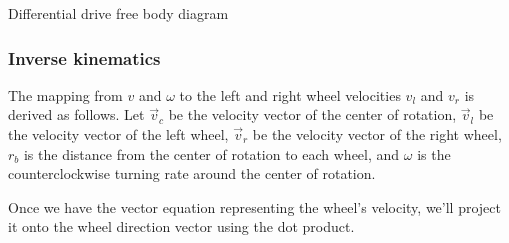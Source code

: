 \begin{bookfigure}

  \caption{Differential drive free body diagram}
  \label{fig:differential_drive_fbd}
\end{bookfigure}

\subsubsection{Inverse kinematics}

The mapping from $v$ and $\omega$ to the left and right wheel velocities $v_l$
and $v_r$ is derived as follows. Let $\vec{v}_c$ be the velocity vector of the
center of rotation, $\vec{v}_l$ be the velocity vector of the left wheel,
$\vec{v}_r$ be the velocity vector of the right wheel, $r_b$ is the distance
from the center of rotation to each wheel, and $\omega$ is the counterclockwise
turning rate around the center of rotation.

Once we have the vector equation representing the wheel's velocity, we'll
project it onto the wheel direction vector using the dot product.

